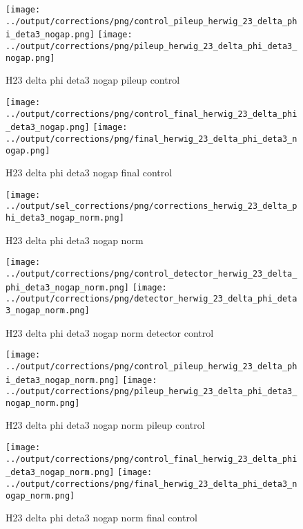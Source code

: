 \documentclass[11pt]{book}
\begin{document}
\begin{figure}[ht]
\centering
\texttt{[image: ../output/corrections/png/control\_pileup\_herwig\_23\_delta\_phi\_deta3\_nogap.png]}
\texttt{[image: ../output/corrections/png/pileup\_herwig\_23\_delta\_phi\_deta3\_nogap.png]}
\caption{H23 delta phi deta3 nogap pileup control}
\label{fig:H23_delta_phi_deta3_nogap_pileup_control}
\end{figure}


\begin{figure}[ht]
\centering
\texttt{[image: ../output/corrections/png/control\_final\_herwig\_23\_delta\_phi\_deta3\_nogap.png]}
\texttt{[image: ../output/corrections/png/final\_herwig\_23\_delta\_phi\_deta3\_nogap.png]}
\caption{H23 delta phi deta3 nogap final control}
\label{fig:H23_delta_phi_deta3_nogap_final_control}
\end{figure}

\begin{figure}[ht]
\centering
\texttt{[image: ../output/sel\_corrections/png/corrections\_herwig\_23\_delta\_phi\_deta3\_nogap\_norm.png]}
\caption{H23 delta phi deta3 nogap norm}
\label{fig:H23_delta_phi_deta3_nogap_norm}
\end{figure}


\begin{figure}[ht]
\centering
\texttt{[image: ../output/corrections/png/control\_detector\_herwig\_23\_delta\_phi\_deta3\_nogap\_norm.png]}
\texttt{[image: ../output/corrections/png/detector\_herwig\_23\_delta\_phi\_deta3\_nogap\_norm.png]}
\caption{H23 delta phi deta3 nogap norm detector control}
\label{fig:H23_delta_phi_deta3_nogap_norm_detector_control}
\end{figure}

\begin{figure}[ht]
\centering
\texttt{[image: ../output/corrections/png/control\_pileup\_herwig\_23\_delta\_phi\_deta3\_nogap\_norm.png]}
\texttt{[image: ../output/corrections/png/pileup\_herwig\_23\_delta\_phi\_deta3\_nogap\_norm.png]}
\caption{H23 delta phi deta3 nogap norm pileup control}
\label{fig:H23_delta_phi_deta3_nogap_norm_pileup_control}
\end{figure}


\begin{figure}[ht]
\centering
\texttt{[image: ../output/corrections/png/control\_final\_herwig\_23\_delta\_phi\_deta3\_nogap\_norm.png]}
\texttt{[image: ../output/corrections/png/final\_herwig\_23\_delta\_phi\_deta3\_nogap\_norm.png]}
\caption{H23 delta phi deta3 nogap norm final control}
\label{fig:H23_delta_phi_deta3_nogap_norm_final_control}
\end{figure}
\end{document}
